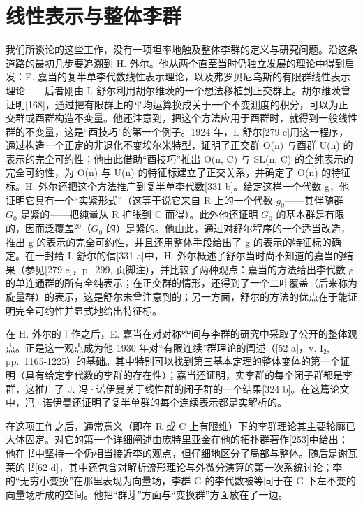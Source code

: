 \section{线性表示与整体李群}

我们所谈论的这些工作，没有一项坦率地触及整体李群的定义与研究问题。沿这条道路的最初几步要追溯到 H. 外尔。他从两个直至当时仍独立发展的理论中得到启发：E. 嘉当的复半单李代数线性表示理论，以及弗罗贝尼乌斯的有限群线性表示理论——后者刚由 I. 舒尔利用胡尔维茨的一个想法移植到正交群上。胡尔维茨曾证明{[}168{]}，通过把有限群上的平均运算换成关于一个不变测度的积分，可以为正交群或酉群构造不变量。他还注意到，把这个方法应用于酉群时，就得到一般线性群的不变量，这是“酉技巧”的第一个例子。1924 年，I. 舒尔{[}279 e{]}用这一程序，通过构造一个正定的非退化不变埃尔米特型，证明了正交群 O(n) 与酉群 U(n) 的表示的完全可约性；他由此借助“酉技巧”推出 O(n, C) 与 SL(n, C) 的全纯表示的完全可约性，为 O(n) 与 U(n) 的特征标建立了正交关系，并确定了 O(n) 的特征标。H. 外尔还把这个方法推广到复半单李代数{[}331 b{]}。给定这样一个代数 g，他证明它具有一个“实紧形式”（这等于说它来自 R 上的一个代数 \(g_{0}\)——其伴随群 \(G_{0}\) 是紧的——把纯量从 R 扩张到 C 而得）。此外他还证明 \(G_{0}\) 的基本群是有限的，因而泛覆盖\(^{20}\)（\(G_{0}\) 的）是紧的。他由此，通过对舒尔程序的一个适当改造，推出 g 的表示的完全可约性，并且还用整体手段给出了 g 的表示的特征标的确定。在一封给 I. 舒尔的信{[}331 a{]}中，H. 外尔概述了舒尔当时尚不知道的嘉当的结果（参见{[}279 e{]}，p.~299, 页脚注），并比较了两种观点：嘉当的方法给出李代数 g 的单连通群的所有全纯表示；在正交群的情形，还得到了一个二叶覆盖（后来称为旋量群）的表示，这是舒尔未曾注意到的；另一方面，舒尔的方法的优点在于能证明完全可约性并显式地给出特征标。

在 H. 外尔的工作之后，E. 嘉当在对对称空间与李群的研究中采取了公开的整体观点。正是这一观点成为他 1930 年对“有限连续”群理论的阐述（{[}52 a{]}，v. I₂, pp.~1165-1225）的基础。其中特别可以找到第三基本定理的整体变体的第一个证明（具有给定李代数的李群的存在性）；嘉当还证明，实李群的每个闭子群都是李群，这推广了 J. 冯·诺伊曼关于线性群的闭子群的一个结果{[}324 b{]}。在这篇论文中，冯·诺伊曼还证明了复半单群的每个连续表示都是实解析的。

在这项工作之后，通常意义（即在 R 或 C 上有限维）下的李群理论其主要轮廓已大体固定。对它的第一个详细阐述由庞特里亚金在他的拓扑群著作{[}253{]}中给出；他在书中坚持一个仍相当接近李的观点，但仔细地区分了局部与整体。随后是谢瓦莱的书{[}62 d{]}，其中还包含对解析流形理论与外微分演算的第一次系统讨论；李的“无穷小变换”在那里表现为向量场，李群 G 的李代数被等同于在 G 下左不变的向量场所成的空间。他把“群芽”方面与“变换群”方面放在了一边。

